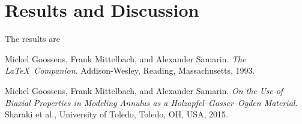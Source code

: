 \documentclass[12pt]{article}
\begin{document}
\section{Results and Discussion}

The results are 


\pagebreak
\begin{thebibliography}{9}
  Michel Goossens, Frank Mittelbach, and Alexander Samarin. 
  \textit{The \LaTeX\ Companion}. 
  Addison-Wesley, Reading, Massachusetts, 1993.

  Michel Goossens, Frank Mittelbach, and Alexander Samarin. 
  \textit{On the Use of Biaxial Properties in Modeling Annulus as a Holzapfel–Gasser–Ogden Material}. 
  Sharaki et al., University of Toledo, Toledo, OH, USA, 2015.

\end{thebibliography}
\end{document}
